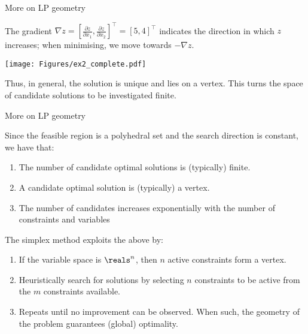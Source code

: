 \begin{frame}{More on LP geometry}

The \alert{gradient} $\nabla z=[\frac{\partial z}{\partial x_1},\frac{\partial z}{\partial x_2}]^\top=[5,4]^\top$ indicates the direction in which $z$ increases; when minimising, we move towards $-\nabla z$. 
\vspace{-6pt}
\begin{center}
\texttt{[image: Figures/ex2\_complete.pdf]}
\end{center}
\vspace{-15pt}
Thus, in general, the solution is unique and \alert{lies on a vertex}. This turns the space of candidate solutions to be investigated \alert{finite}.

\end{frame}


\begin{frame}{More on LP geometry}

Since the feasible region is a \alert{polyhedral set} and the search direction is constant, we have that:
\begin{enumerate}[<+->]
	\item The number of candidate optimal solutions is (typically) \alert{finite}.
	\item A candidate optimal solution is (typically) a \alert{vertex}.
	\item The number of candidates increases \alert{exponentially} with the number of constraints and variables	
\end{enumerate}

\onslide<+->
The \alert{simplex method} exploits the above by: 
\begin{enumerate}[<+->]
	\item If the variable space is $\reals^n$, then \alert{$n$ active constraints form a vertex}.
	\item \alert{Heuristically} search for solutions by selecting $n$ constraints to be active from the $m$ constraints available. 
	\item Repeats until no improvement can be observed. When such, the \alert{geometry} of the problem guarantees \alert{(global) optimality}. 	
\end{enumerate}


 
 


\end{frame}


